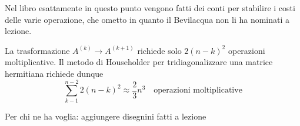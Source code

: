 \begin{notes}
  Nel libro esattamente in questo punto vengono fatti dei conti per
  stabilire i costi delle varie operazione, che ometto in quanto il
  Bevilacqua non li ha nominati a lezione.
\end{notes}

La trasformazione $A^{(k)} \rightarrow A^{(k+1)}$ richiede solo $2(n -
k)^2$ operazioni moltiplicative. Il metodo di Householder per
tridiagonalizzare una matrice hermitiana richiede dunque
$$
\displaystyle \sum_{k-1}^{n-2} 2(n-k)^{2} \approx \frac{2}{3}n^{3}
\quad \text{operazioni moltiplicative}
$$

\begin{workinprogress}
  Per chi ne ha voglia: aggiungere disegnini fatti a lezione
\end{workinprogress}


